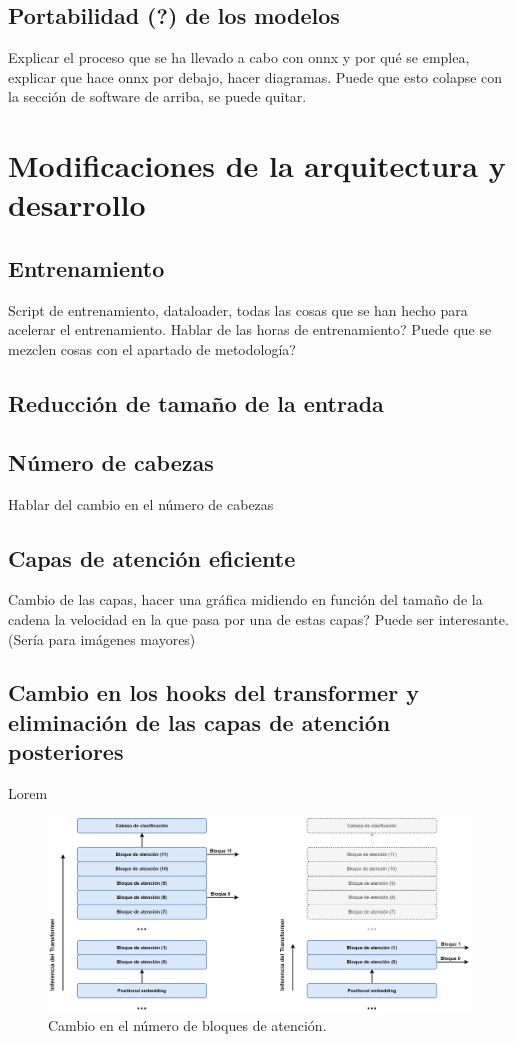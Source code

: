 \documentclass[a4paper, 11pt]{article}
\begin{document}






\subsection{Portabilidad (?) de los modelos}
Explicar el proceso que se ha llevado a cabo con onnx y por qué se emplea, explicar que hace onnx por debajo, hacer diagramas. Puede que esto colapse con la sección de software de arriba, se puede quitar.


\clearpage
\section{Modificaciones de la arquitectura y desarrollo}
\subsection{Entrenamiento}
Script de entrenamiento, dataloader, todas las cosas que se han hecho para acelerar el entrenamiento. Hablar de las horas de entrenamiento? Puede que se mezclen cosas con el apartado de metodología?
\subsection{Reducción de tamaño de la entrada}
\subsection{Número de cabezas}
Hablar del cambio en el número de cabezas
\subsection{Capas de atención eficiente}
Cambio de las capas, hacer una gráfica midiendo en función del tamaño de la cadena la velocidad en la que pasa por una de estas capas? Puede ser interesante. (Sería para imágenes mayores)
\subsection{Cambio en los hooks del transformer y eliminación de las capas de atención posteriores}
Lorem
\begin{figure}[H]
\centering
\includegraphics[width=\textwidth]{imagenes/DPT-cambio-bloques-transformer.png}
\caption{Cambio en el número de bloques de atención.}
\label{fig:attention_block_num}
\end{figure}
\end{document}
